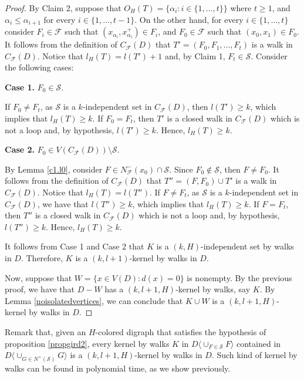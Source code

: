\documentclass[10pt,a4paper]{article}
\begin{document}
\begin{proof}
By Claim 2, suppose that $O_{H}(T)=\{ \alpha_{i} : i \in \{1, \ldots , t \} \}$ where $t \geq 1$, and $\alpha_{i} \leq \alpha_{i+1}$ for every $ i \in \{ 1, \ldots , t-1 \}$. On the other hand, for every $i \in \{ 1, \ldots , t \}$ consider $F_{i} \in \mathscr{F}$ such that $(x_{\alpha_{i}}, x_{\alpha_{i}}^{+} ) \in F_{i}$, and $F_{0} \in \mathscr{F}$ such that $(x_{0}, x_{1}) \in F_{0}$. It follows from the definition of $C_{\mathscr{F}}(D)$ that $T'=(F_{0}, F_{1}, \ldots , F_{t})$ is a walk in $C_{\mathscr{F}}(D)$. Notice that $l_{H}(T)=l(T')+1$ and, by Claim 1, $F_{t} \in \mathcal{S}$. Consider the following cases:

	\begin{description}
	\item	\textbf{Case 1.} $F_{0} \in \mathcal{S}$.

If $F_{0} \neq F_{t}$, as $\mathcal{S}$ is a $k$-independent set in $C_{\mathscr{F}}(D)$, then $l(T') \geq k$, which implies that $l_{H}(T) \geq k$.  
If $F_{0} =F_{t}$, then $T'$ is a closed walk in $C_{\mathscr{F}}(D)$ which is not a loop and, by hypothesis, $l(T')\geq k$. Hence, $l_{H}(T) \geq k$.
 
	\item \textbf{Case 2.} $F_{0} \in V(C_{\mathscr{F}}(D))\setminus \mathcal{S}$.

By Lemma \ref{c1.l0}, consider $F \in N^{-}_{\mathscr{F}}(x_{0}) \cap \mathcal{S}$. Since $F_{0} \notin \mathcal{S}$, then $F \neq F_{0}$. It follows from the definition of $C_{\mathscr{F}}(D)$ that $T'' =(F, F_{0} ) \cup T'$ is a walk in $C_{\mathscr{F}}(D)$. Notice that $l_{H}(T)=l(T'')$. If $F\neq F_{t}$, as  $\mathcal{S}$ is a $k$-independent set in $C_{\mathscr{F}}(D)$, we have that $l(T'') \geq k$, which implies that $l_{H}(T) \geq k$. If $F=F_{t}$, then  $T''$ is a closed walk in $C_{\mathscr{F}}(D)$ which is not a loop and, by hypothesis, $l(T'')\geq k$. Hence, $l_{H}(T) \geq k$.
	\end{description}

It follows from Case 1 and Case 2 that $K$ is a $(k,H)$-independent set by walks in $D$. Therefore, $K$ is a $(k,l+1)$-kernel by walks in $D$. 

Now, suppose that $W=\{ x \in V(D) : d(x)=0 \}$ is nonempty. By the previous proof, we have that $D - W$ has a $(k,l +1 ,H)$-kernel by walks, say $K$. By Lemma \ref{noisolatedvertices}, we can conclude that $K \cup W$ is a $(k, l+1,H)$-kernel by walks in $D$.
\end{proof}

Remark that, given an $H$-colored digraph that satisfies the hypothesis of proposition \ref{propgird2}, every kernel by walks $K$ in $D\langle \cup _{F \in \mathcal{S}} F \rangle $ contained in $D\langle \cup _{G\in N^{+}(\mathcal{S})}G \rangle$ is a $(k,l+1,H)$-kernel by walks in $D$. Such kind of kernel by walks can be found in polynomial time, as we show previously.
\end{document}

